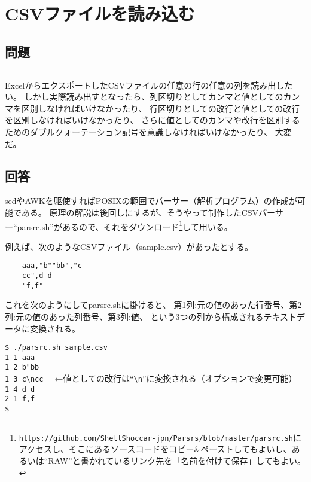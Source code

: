 \section{CSVファイルを読み込む}
\label{recipe:CSV_parser}

\subsection*{問題}
\noindent
$\!\!\!\!\!$
\begin{grshfboxit}{160.0mm}
	ExcelからエクスポートしたCSVファイルの任意の行の任意の列を読み出したい。
	しかし実際読み出すとなったら、列区切りとしてカンマと値としてのカンマを区別しなければいけなかったり、
	行区切りとしての改行と値としての改行を区別しなければいけなかったり、
	さらに値としてのカンマや改行を区別するためのダブルクォーテーション記号を意識しなければいけなかったり、
	大変だ。
\end{grshfboxit}

\subsection*{回答}
sedやAWKを駆使すればPOSIXの範囲でパーサー（解析プログラム）の作成が可能である。
原理の解説は後回しにするが、そうやって制作したCSVパーサー``parsrc.sh''があるので、それをダウンロード\footnote{\verb|https://github.com/ShellShoccar-jpn/Parsrs/blob/master/parsrc.sh|にアクセスし、そこにあるソースコードをコピー\&{}ペーストしてもよいし、あるいは``RAW''と書かれているリンク先を「名前を付けて保存」してもよい。}して用いる。

例えば、次のようなCSVファイル（sample.csv）があったとする。\\
\begin{frameboxit}{160.0mm}
\begin{verbatim}
	aaa,"b""bb","c
	cc",d d
	"f,f"
\end{verbatim}
\end{frameboxit}

これを次のようにしてparsrc.shに掛けると、
第1列:元の値のあった行番号、第2列:元の値のあった列番号、第3列:値、
という3つの列から構成されるテキストデータに変換される。
\begin{screen}
	\verb|$ ./parsrc.sh sample.csv| \return \\
	\verb|1 1 aaa    | \\
	\verb|1 2 b"bb   | \\
	\verb|1 3 c\ncc  | ←値としての改行は``\verb|\n|''に変換される（オプションで変更可能） \\
	\verb|1 4 d d    | \\
	\verb|2 1 f,f    | \\
	\verb|$ |
\end{screen}

